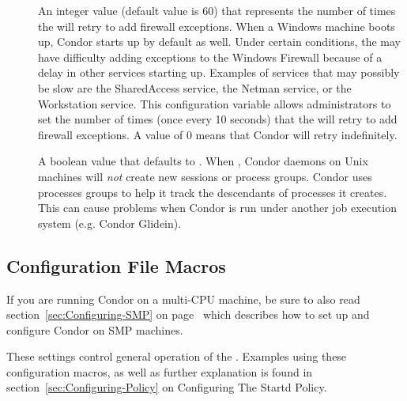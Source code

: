 \begin{description}
\item[]
  \label{param:WindowsFirewallFailureRetry} 
  An integer value (default value is 60) that represents
  the number of times the  will retry to add
  firewall exceptions.
  When a Windows machine boots
  up, Condor starts up by default as well. Under certain conditions, the
   may have difficulty adding exceptions to the Windows
  Firewall because of a delay in other services starting up.
  Examples of services that may possibly be slow are the 
  SharedAccess service, the Netman service, or the Workstation service.
  This configuration variable allows administrators to set the number of
  times (once every 10 seconds) that the  will retry
  to add firewall exceptions. A value of 0 means that Condor will
  retry indefinitely.

\item[]
  \label{param:UseProcessGroups} 
  A boolean value that defaults to .  When ,
  Condor daemons on Unix machines will \emph{not} create new sessions
  or process groups. Condor uses processes groups to help it track the
  descendants of processes it creates. This can cause problems when
  Condor is run under another job execution system (e.g. Condor Glidein).

\end{description}

\subsection{\label{sec:Startd-Config-File-Entries}
Configuration File Macros}

\Note If you are running Condor on a multi-CPU machine, be sure
to also read section~\ref{sec:Configuring-SMP} on
page~\pageref{sec:Configuring-SMP} which describes how to set up and
configure Condor on SMP machines.

These settings control general operation of the .
Examples using these configuration macros,
as well as further explanation is found in
section~\ref{sec:Configuring-Policy} on
Configuring The Startd Policy.

